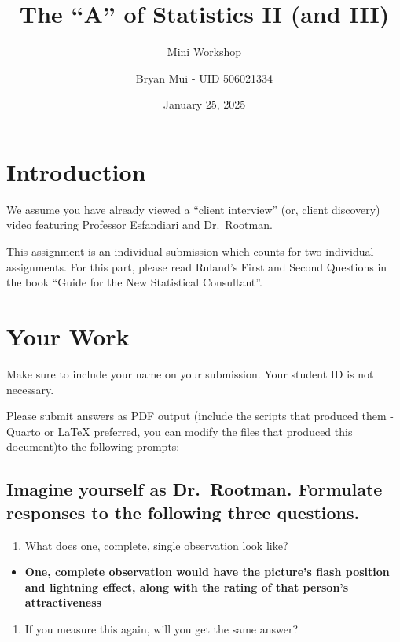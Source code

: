 \documentclass[
  letterpaper,
  DIV=11,
  numbers=noendperiod]{scrartcl}
\title{The ``A'' of Statistics II (and III)}
\subtitle{Mini Workshop}
\author{Bryan Mui - UID 506021334}
\date{January 25, 2025}
\providecommand{\tightlist}{%
  \setlength{\itemsep}{0pt}\setlength{\parskip}{0pt}}\usepackage{longtable,booktabs,array}
\begin{document}
\maketitle


\section{Introduction}\label{introduction}

We assume you have already viewed a ``client interview'' (or, client
discovery) video featuring Professor Esfandiari and Dr.~Rootman.

This assignment is an individual submission which counts for two
individual assignments. For this part, please read Ruland's First and
Second Questions in the book ``Guide for the New Statistical
Consultant''.

\section{Your Work}\label{your-work}

Make sure to include your name on your submission. Your student ID is
not necessary.

Please submit answers as PDF output (include the scripts that produced
them - Quarto or LaTeX preferred, you can modify the files that produced
this document)to the following prompts:

\subsection{Imagine yourself as Dr.~Rootman. Formulate responses to the
following three
questions.}\label{imagine-yourself-as-dr.-rootman.-formulate-responses-to-the-following-three-questions.}

\begin{enumerate}
\def\labelenumi{\arabic{enumi}.}
\tightlist
\item
  What does one, complete, single observation look like?
\end{enumerate}

\begin{itemize}
\tightlist
\item
  \textbf{One, complete observation would have the picture's flash
  position and lightning effect, along with the rating of that person's
  attractiveness}
\end{itemize}

\begin{enumerate}
\def\labelenumi{\arabic{enumi}.}
\setcounter{enumi}{1}
\tightlist
\item
  If you measure this again, will you get the same answer?\\
\end{enumerate}
\end{document}
